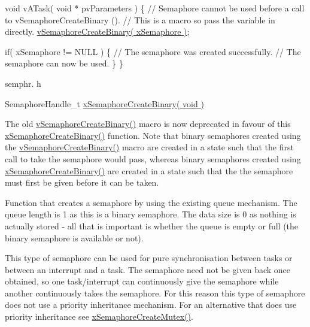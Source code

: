 \begin{DoxyPre}void vATask( void * pvParameters )
\{
   // Semaphore cannot be used before a call to vSemaphoreCreateBinary ().
   // This is a macro so pass the variable in directly.
   \hyperlink{semphr_8h_ae10bffadd26fbd5bcce76bf33a83ef30}{vSemaphoreCreateBinary( xSemaphore )};\end{DoxyPre}



\begin{DoxyPre}   if( xSemaphore != NULL )
   \{
       // The semaphore was created successfully.
       // The semaphore can now be used.
   \}
\}
\end{DoxyPre}


semphr. h 
\begin{DoxyPre}SemaphoreHandle\_t \hyperlink{semphr_8h_acba963695e4f159d9bfa2394cae5badc}{xSemaphoreCreateBinary( void )}\end{DoxyPre}


The old \hyperlink{semphr_8h_ae10bffadd26fbd5bcce76bf33a83ef30}{v\+Semaphore\+Create\+Binary()} macro is now deprecated in favour of this \hyperlink{semphr_8h_acba963695e4f159d9bfa2394cae5badc}{x\+Semaphore\+Create\+Binary()} function. Note that binary semaphores created using the \hyperlink{semphr_8h_ae10bffadd26fbd5bcce76bf33a83ef30}{v\+Semaphore\+Create\+Binary()} macro are created in a state such that the first call to \textquotesingle{}take\textquotesingle{} the semaphore would pass, whereas binary semaphores created using \hyperlink{semphr_8h_acba963695e4f159d9bfa2394cae5badc}{x\+Semaphore\+Create\+Binary()} are created in a state such that the the semaphore must first be \textquotesingle{}given\textquotesingle{} before it can be \textquotesingle{}taken\textquotesingle{}.

Function that creates a semaphore by using the existing queue mechanism. The queue length is 1 as this is a binary semaphore. The data size is 0 as nothing is actually stored -\/ all that is important is whether the queue is empty or full (the binary semaphore is available or not).

This type of semaphore can be used for pure synchronisation between tasks or between an interrupt and a task. The semaphore need not be given back once obtained, so one task/interrupt can continuously \textquotesingle{}give\textquotesingle{} the semaphore while another continuously \textquotesingle{}takes\textquotesingle{} the semaphore. For this reason this type of semaphore does not use a priority inheritance mechanism. For an alternative that does use priority inheritance see \hyperlink{semphr_8h_aa6a00aa9b91a9e5b3ebe4ae1c3f115c6}{x\+Semaphore\+Create\+Mutex()}.


